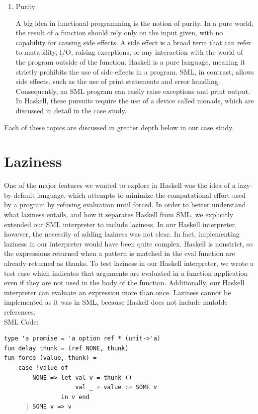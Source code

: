 \documentclass[journal]{IEEEtran}
\begin{document}
\begin{enumerate}
\item Purity
	
A big idea in functional programming is the notion of purity. In a pure world, the result of a function should rely only on the input given, with no capability for causing side effects. A side effect is a broad term that can refer to mutability, I/O, raising exceptions, or any interaction with the world of the program outside of the function. Haskell is a pure language, meaning it strictly prohibits the use of side effects in a program. SML, in contrast, allows side effects, such as the use of print statements and error handling. Consequently, an SML program can easily raise exceptions and print output. In Haskell, these pursuits require the use of a device called monads, which are discussed in detail in the case study.\\

\end{enumerate}
Each of these topics are discussed in greater depth below in our case study.

\section{Laziness}
One of the major features we wanted to explore in Haskell was the idea of a lazy-by-default language, which attempts to minimize the computational effort used by a program by refusing evaluation until forced. In order to better understand what laziness entails, and how it separates Haskell from SML, we explicitly extended our SML interpreter to include laziness. In our Haskell interpreter, however, the necessity of adding laziness was not clear. In fact, implementing laziness in our interpreter would have been quite complex. Haskell is nonstrict, so the expressions returned when a pattern is matched in the eval function are already returned as thunks. To test laziness in our Haskell interpreter, we wrote a test case which indicates that arguments are evaluated in a function application even if they are not used in the body of the function. Additionally, our Haskell interpreter can evaluate an expression more than once. Laziness cannot be implemented as it was in SML, because Haskell does not include mutable references. \\

SML Code: \\
\small
\begin{verbatim}
type 'a promise = 'a option ref * (unit->'a)
fun delay thunk = (ref NONE, thunk)
fun force (value, thunk) =
    case !value of
        NONE => let val v = thunk ()
                    val _ = value := SOME v
                in v end
      | SOME v => v
\end{verbatim}
\normalsize
\end{document}
